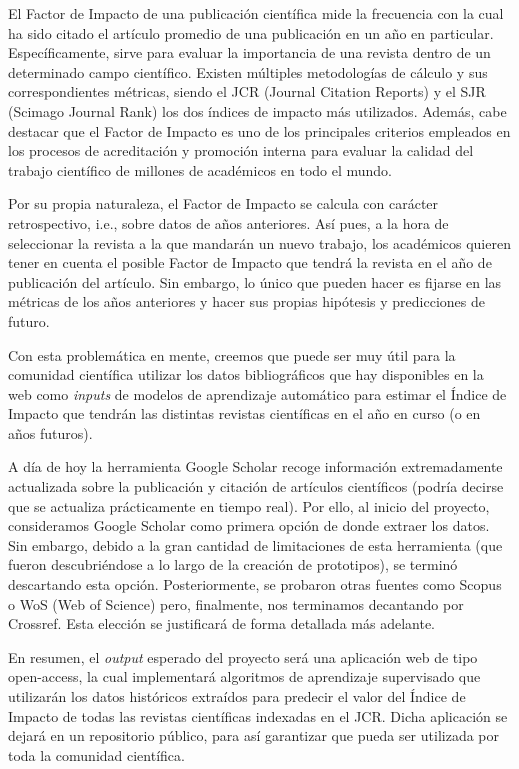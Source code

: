 
El Factor de Impacto de una publicación científica mide la frecuencia con la cual ha sido citado el artículo promedio de una publicación en un año en particular. Específicamente, sirve para evaluar la importancia de una revista dentro de un determinado campo científico. Existen múltiples metodologías de cálculo y sus correspondientes métricas, siendo el JCR (Journal Citation Reports) y el SJR (Scimago Journal Rank) los dos índices de impacto más utilizados.
Además, cabe destacar que el Factor de Impacto es uno de los principales criterios empleados en los procesos de acreditación y promoción interna para evaluar la calidad del trabajo científico de millones de académicos en todo el mundo.

Por su propia naturaleza, el Factor de Impacto se calcula con carácter retrospectivo, i.e., sobre datos de años anteriores. Así pues, a la hora de seleccionar la revista a la que mandarán un nuevo trabajo, los académicos quieren tener en cuenta el posible Factor de Impacto que tendrá la revista en el año de publicación del artículo. Sin embargo, lo único que pueden hacer es fijarse en las métricas de los años anteriores y hacer sus propias hipótesis y predicciones de futuro.

Con esta problemática en mente, creemos que puede ser muy útil para la comunidad científica utilizar los datos bibliográficos que hay disponibles en la web como \textit{inputs} de modelos de aprendizaje automático para estimar el Índice de Impacto que tendrán las distintas revistas científicas en el año en curso (o en años futuros).

A día de hoy la herramienta Google Scholar recoge información extremadamente actualizada sobre la publicación y citación de artículos científicos (podría decirse que se actualiza prácticamente en tiempo real). Por ello, al inicio del proyecto, consideramos Google Scholar como primera opción de donde extraer los datos. Sin embargo, debido a la gran cantidad de limitaciones de esta herramienta (que fueron descubriéndose a lo largo de la creación de prototipos), se terminó descartando esta opción. Posteriormente, se probaron otras fuentes como Scopus o WoS (Web of Science) pero, finalmente, nos terminamos decantando por Crossref. Esta elección se justificará de forma detallada más adelante.

En resumen, el \textit{output} esperado del proyecto será una aplicación web de tipo open-access, la cual implementará algoritmos de aprendizaje supervisado que utilizarán los datos históricos extraídos para predecir el valor del Índice de Impacto de todas las revistas científicas indexadas en el JCR. Dicha aplicación se dejará en un repositorio público, para así garantizar que pueda ser utilizada por toda la comunidad científica. 

